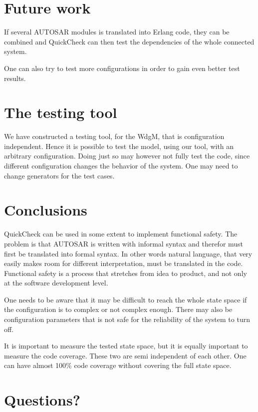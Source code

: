\documentclass[a4paper]{article}
\begin{document}
\section{Future work}
If several AUTOSAR modules is translated into Erlang code, they can be
combined and QuickCheck can then test the dependencies of the whole
connected system.

One can also try to test more configurations in order to gain even
better test results.

\section{The testing tool}
We have constructed a testing tool, for the WdgM, that is configuration
independent. Hence it is possible to test the model, using our tool, with an
arbitrary configuration. Doing just so may however not fully test the code,
since different configuration changes the behavior of the system. One may need
to change generators for the test cases.


\section{Conclusions}
QuickCheck can be used in some extent to implement functional
safety. The problem is that AUTOSAR is written with informal syntax
and therefor must first be translated into formal syntax. In other words
natural language, that very easily makes room for different interpretation,
must be translated in the code.
Functional safety is a process that stretches from idea to product,
and not only at the software development level.

One needs to be aware that it may be difficult to reach the whole
state space if the configuration is to complex or not complex
enough. There may also be configuration parameters that is not safe
for the reliability of the system to turn off.

It is important to measure the tested state space, but it is equally
important to measure the code coverage. These two are semi independent
of each other. One can have almost 100\% code coverage without covering
the full state space.

\section{Questions?}
\end{document}
